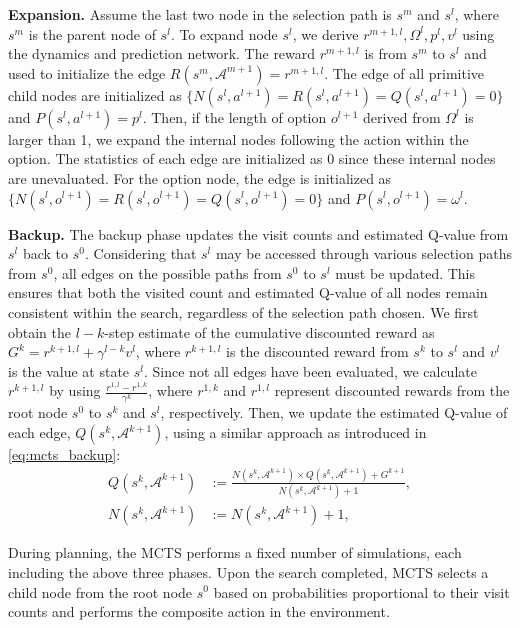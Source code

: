 \textbf{Expansion.} Assume the last two node in the selection path is $s^m$ and $s^l$, where $s^m$ is the parent node of $s^l$.
To expand node $s^l$, we derive $r^{m+1,l}, \Omega^l, p^l, v^l$ using the dynamics and prediction network.
The reward $r^{m+1,l}$ is from $s^{m}$ to $s^l$ and used to initialize the edge $R(s^{m}, \mathcal{A}^{m+1})=r^{m+1,l}$.
The edge of all primitive child nodes are initialized as $\{N(s^l, a^{l+1})=R(s^l, a^{l+1})=Q(s^l, a^{l+1})=0\}$ and $P(s^l, a^{l+1})=p^l$.
Then, if the length of option $o^{l+1}$ derived from $\Omega^l$ is larger than 1, we expand the internal nodes following the action within the option.
The statistics of each edge are initialized as 0 since these internal nodes are unevaluated.
For the option node, the edge is initialized as $\{N(s^l, o^{l+1})=R(s^l, o^{l+1})=Q(s^l, o^{l+1})=0\}$ and $P(s^l, o^{l+1})=\omega^l$.

\textbf{Backup.} The backup phase updates the visit counts and estimated Q-value from $s^l$ back to $s^0$.
Considering that $s^l$ may be accessed through various selection paths from $s^0$, all edges on the possible paths from $s^0$ to $s^l$ must be updated.
This ensures that both the visited count and estimated Q-value of all nodes remain consistent within the search, regardless of the selection path chosen.
We first obtain the $l-k$-step estimate of the cumulative discounted reward as $G^{k}=r^{k+1,l}+\gamma^{l-k}v^l$, where $r^{k+1,l}$ is the discounted reward from $s^k$ to $s^l$ and $v^l$ is the value at state $s^l$.
Since not all edges have been evaluated, we calculate $r^{k+1,l}$ by using $\frac{r^{1,l}-r^{1,k}}{\gamma^k}$, where $r^{1,k}$ and $r^{1,l}$ represent discounted rewards from the root node $s^0$ to $s^k$ and $s^l$, respectively.
Then, we update the estimated Q-value of each edge, $Q(s^k,\mathcal{A}^{k+1})$, using a similar approach as introduced in \eqref{eq:mcts_backup}:
\begin{equation}\label{eq:option_mcts_backup}
\begin{aligned}
    Q(s^k,\mathcal{A}^{k+1}) & :=\frac{N(s^k,\mathcal{A}^{k+1})\times Q(s^k,\mathcal{A}^{k+1})+G^{k+1}}{N(s^k,\mathcal{A}^{k+1})+1},\\
    N(s^k,\mathcal{A}^{k+1}) & :=N(s^k,\mathcal{A}^{k+1})+1,
\end{aligned}
\end{equation}

During planning, the MCTS performs a fixed number of simulations, each including the above three phases.
Upon the search completed, MCTS selects a child node from the root node $s^0$ based on probabilities proportional to their visit counts and performs the composite action in the environment.

